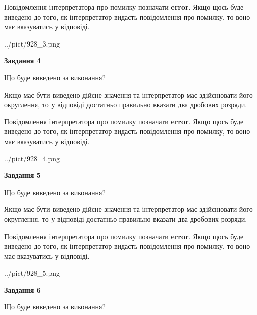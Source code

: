 \documentclass[12pt, ukrainian]{article}
\begin{document}
{\begin {Large}
Повідомлення інтерпретатора про помилку позначати \textbf{error}.
Якщо щось буде виведено до того, як інтерпретатор видасть повідомлення про помилку, 
то воно має вказуватись у відповіді. \par

\begin{center}
	{../pict/928_3.png}
\end{center}
\newpage

{\begin {center}\textbf{Завдання 4}\end {center}}\par
Що буде виведено за виконання? \par

Якщо має бути виведено дійсне значення та інтерпретатор має здійснювати його округлення, 
то у відповіді достатньо правильно вказати два дробових розряди.

Повідомлення інтерпретатора про помилку позначати \textbf{error}.
Якщо щось буде виведено до того, як інтерпретатор видасть повідомлення про помилку, 
то воно має вказуватись у відповіді. \par

\begin{center}
	{../pict/928_4.png}
\end{center}
\newpage

{\begin {center}\textbf{Завдання 5}\end {center}}\par
Що буде виведено за виконання? \par

Якщо має бути виведено дійсне значення та інтерпретатор має здійснювати його округлення, 
то у відповіді достатньо правильно вказати два дробових розряди.

Повідомлення інтерпретатора про помилку позначати \textbf{error}.
Якщо щось буде виведено до того, як інтерпретатор видасть повідомлення про помилку, 
то воно має вказуватись у відповіді. \par

\begin{center}
	{../pict/928_5.png}
\end{center}
\newpage

{\begin {center}\textbf{Завдання 6}\end {center}}\par
Що буде виведено за виконання? \par


\end{Large}}
\end{document}
